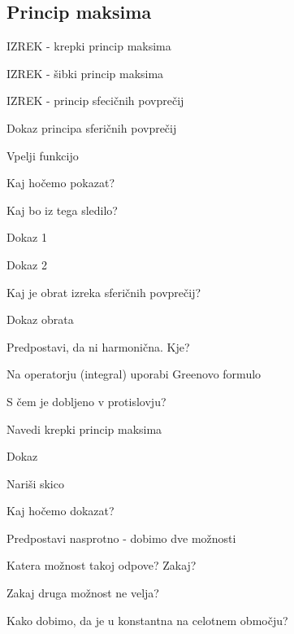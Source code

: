 \documentclass{article}
\begin{document}
    \subsection{Princip maksima}
    \begin{enumerate}
        \item IZREK - krepki princip maksima
        \item IZREK - šibki princip maksima
        {\color{red}\item IZREK - princip sfecičnih povprečij}
        {\color{red}\item Dokaz principa sferičnih povprečij}
        \begin{itemize}
        {\color{red}    \item Vpelji funkcijo}
        {\color{red}    \item Kaj hočemo pokazat?}
        {\color{red}    \item Kaj bo iz tega sledilo?}
            \item Dokaz 1
            {\color{red}\item Dokaz 2}
        \end{itemize}
        \item Kaj je obrat izreka sferičnih povprečij?
        \item Dokaz obrata
        \begin{itemize}
            \item Predpostavi, da ni harmonična. Kje?
            {\color{red}\item Na operatorju (integral) uporabi Greenovo formulo}
            {\color{red}\item S čem je dobljeno v protislovju?}
        \end{itemize}
        \item Navedi krepki princip maksima
        \item Dokaz
        \begin{itemize}
            \item Nariši skico
            {\color{red}\item Kaj hočemo dokazat?}
            \item Predpostavi nasprotno - dobimo dve možnosti
            \item Katera možnost takoj odpove? Zakaj?
            {\color{red}\item Zakaj druga možnost ne velja?}
            \item Kako dobimo, da je u konstantna na celotnem območju?
        \end{itemize}
    \end{enumerate}
\end{document}

